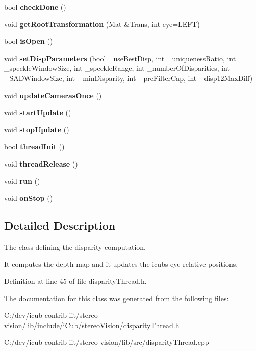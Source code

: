 \begin{DoxyCompactItemize}
\mbox{\label{classDisparityThread_ac4e45d17e21d68002ed8a3a979e7abab}} 
bool {\bfseries check\+Done} ()
\item 
\mbox{\label{classDisparityThread_a9300dc8b230296501c99032633daa0dc}} 
void {\bfseries get\+Root\+Transformation} (Mat \&Trans, int eye=L\+E\+FT)
\item 
\mbox{\label{classDisparityThread_af6afa37af0ff8dced127c760c016fe74}} 
bool {\bfseries is\+Open} ()
\item 
\mbox{\label{classDisparityThread_a7c03f103346967e4fe23c315a1ad2f95}} 
void {\bfseries set\+Disp\+Parameters} (bool \+\_\+use\+Best\+Disp, int \+\_\+uniqueness\+Ratio, int \+\_\+speckle\+Window\+Size, int \+\_\+speckle\+Range, int \+\_\+number\+Of\+Disparities, int \+\_\+\+S\+A\+D\+Window\+Size, int \+\_\+min\+Disparity, int \+\_\+pre\+Filter\+Cap, int \+\_\+disp12\+Max\+Diff)
\item 
\mbox{\label{classDisparityThread_afcfe2413bbbb52bd2e5737197f8c12b1}} 
void {\bfseries update\+Cameras\+Once} ()
\item 
\mbox{\label{classDisparityThread_a2b80cd97a2bd3f530afdb8615577c2c3}} 
void {\bfseries start\+Update} ()
\item 
\mbox{\label{classDisparityThread_a17f750f7e13366abb05f02ca0310ab91}} 
void {\bfseries stop\+Update} ()
\item 
\mbox{\label{classDisparityThread_a741ecfd39ec8b949997e38ab31e5908e}} 
bool {\bfseries thread\+Init} ()
\item 
\mbox{\label{classDisparityThread_a29bde42a3bfc24ff666e756febc42334}} 
void {\bfseries thread\+Release} ()
\item 
\mbox{\label{classDisparityThread_a88e71e25e8170fe009933cde0c494fca}} 
void {\bfseries run} ()
\item 
\mbox{\label{classDisparityThread_ad354c6f6ee5caba36aea07f66ffbc030}} 
void {\bfseries on\+Stop} ()
\end{DoxyCompactItemize}


\subsection{Detailed Description}
The class defining the disparity computation. 

It computes the depth map and it updates the icub\textquotesingle{}s eye relative positions. 

Definition at line 45 of file disparity\+Thread.\+h.



The documentation for this class was generated from the following files\+:\begin{DoxyCompactItemize}
\item 
C\+:/dev/icub-\/contrib-\/iit/stereo-\/vision/lib/include/i\+Cub/stereo\+Vision/disparity\+Thread.\+h\item 
C\+:/dev/icub-\/contrib-\/iit/stereo-\/vision/lib/src/disparity\+Thread.\+cpp\end{DoxyCompactItemize}
